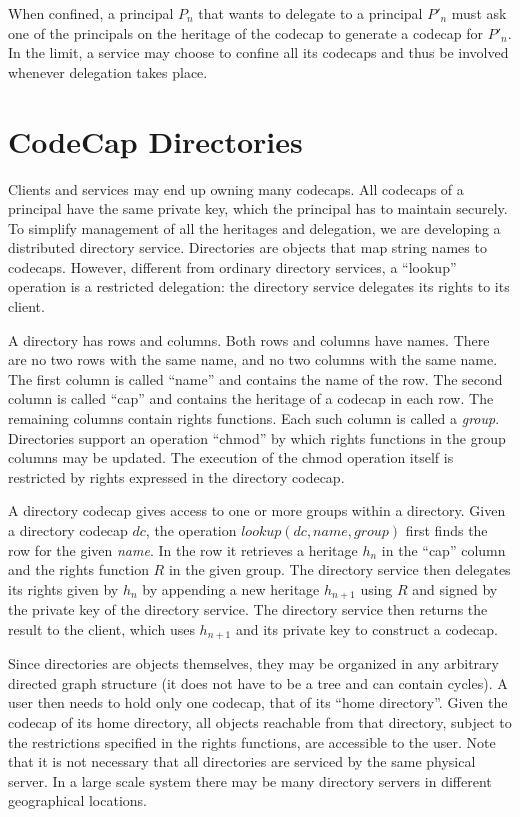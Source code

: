 \documentclass[10pt, conference, compsocconf]{IEEEtran}
\begin{document}
When confined, a principal $P_n$ that wants to delegate to a principal
$P'_n$ must ask one of the principals on the heritage of the codecap
to generate a codecap for $P'_n$.  In the limit, a service may choose
to confine all its codecaps and thus be involved whenever delegation
takes place.

\section{CodeCap Directories}

Clients and services may end up owning many codecaps.
All codecaps of a principal have the same private key, which the
principal has to maintain securely.
To simplify management of all the heritages and delegation,
we are developing a distributed directory service.
Directories are objects that map string names to codecaps.
However, different from ordinary directory services, a ``lookup''
operation is a restricted delegation:
the directory service delegates its rights to its client.

A directory has rows and columns.  Both rows and columns have names.
There are no two rows with the same name, and no two columns with
the same name.  The first column is called ``name'' and contains
the name of the row.  The second column is called ``cap'' and
contains the heritage of a codecap in each row. The remaining columns
contain rights functions.  Each such column is called a \emph{group}.
Directories support an operation ``chmod'' by which rights functions
in the group columns may be updated.
The execution of the chmod operation itself is restricted by rights
expressed in the directory codecap.

A directory codecap gives access to one or more groups within a directory.
Given a directory codecap $\textit{dc}$,
the operation $\textit{lookup}(\textit{dc}, \textit{name}, \textit{group})$
first finds the row for the given \textit{name}.
In the row it retrieves a heritage $h_n$ in the ``cap'' column and the rights
function $R$ in the given group.
The directory service then delegates its rights given by $h_n$ by
appending a new heritage $h_{n+1}$ using $R$ and signed by the private
key of the directory service.
The directory service then returns the result to the
client, which uses $h_{n+1}$ and its private key to construct a codecap.

Since directories are objects themselves, they may be organized in
any arbitrary directed graph structure (it does not have to be a tree
and can contain cycles).  A user then needs to hold
only one codecap, that of its ``home directory''. Given the codecap
of its home directory, all objects reachable from that directory,
subject to the restrictions specified in the rights functions, are
accessible to the user.  Note that it is not necessary that all
directories are serviced by the same physical server.  In a large
scale system there may be many directory servers in different
geographical locations.
\end{document}
